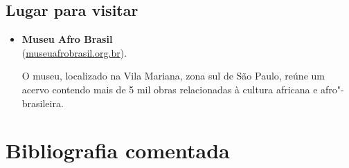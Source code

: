 \documentclass[11pt]{extarticle}
\begin{document}
\subsection{Lugar para visitar}

\begin{itemize}
\item\textbf{Museu Afro Brasil}\\
(\href{http://www.museuafrobrasil.org.br/}{museuafrobrasil.org.br}).

O museu, localizado na Vila Mariana, zona sul de São Paulo, reúne um
acervo contendo mais de 5 mil obras relacionadas à cultura africana e
afro"-brasileira.
\end{itemize}

\section{Bibliografia comentada}
\end{document}

